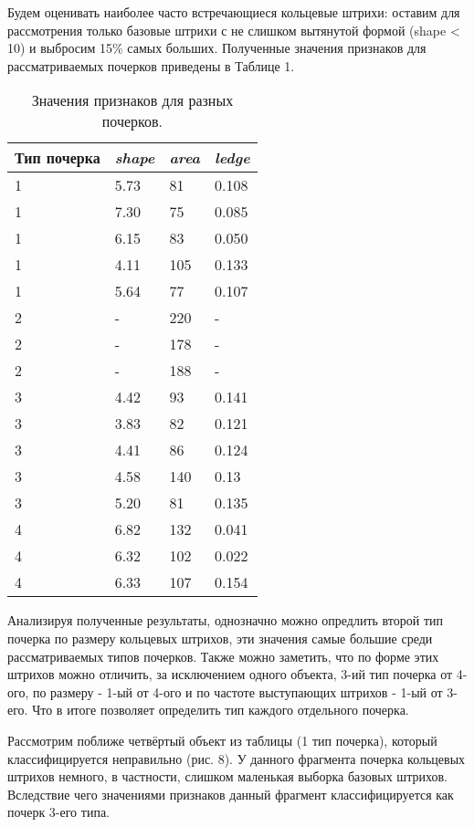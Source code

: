 \documentclass{article}
\begin{document}
Будем оценивать наиболее часто встречающиеся кольцевые штрихи: оставим для рассмотрения только базовые штрихи с не слишком вытянутой формой (shape < 10) и выбросим 15\% самых больших. Полученные значения признаков для рассматриваемых почерков приведены в Таблице 1.

\begin{table}[!h]
    \centering
    \begin{tabular}{|p{4cm}||p{3cm}|p{3cm}|p{3cm}|}
        \hline
        Тип почерка & \emph{shape} & \emph{area} & \emph{ledge}\\ 
        \hline\hline
        1 & 5.73 & 81 & 0.108 \\
        1 & 7.30 & 75 & 0.085 \\
        1 & 6.15 & 83 & 0.050 \\
        1 & 4.11 & 105 & 0.133 \\
        1 & 5.64 & 77 & 0.107 \\
        \hline
        2 & - & 220 & - \\
        2 & - & 178 & - \\
        2 & - & 188 & - \\
        \hline
        3 & 4.42 & 93 & 0.141 \\
        3 & 3.83 & 82 & 0.121 \\
        3 & 4.41 & 86 & 0.124 \\
        3 & 4.58 & 140 & 0.13 \\
        3 & 5.20 & 81 & 0.135 \\
        \hline
        4 & 6.82 & 132 & 0.041 \\
        4 & 6.32 & 102 & 0.022 \\
        4 & 6.33 & 107 & 0.154 \\
        \hline
    \end{tabular}
    \caption{Значения признаков для разных почерков.}
\end{table}

Анализируя полученные результаты, однозначно можно опредлить второй тип почерка по размеру кольцевых штрихов, эти значения самые большие среди рассматриваемых типов почерков. Также можно заметить, что по форме этих штрихов можно отличить, за исключением одного объекта, 3-ий тип почерка от 4-ого, по размеру - 1-ый от 4-ого и по частоте выступающих штрихов - 1-ый от 3-его. Что в итоге позволяет определить тип каждого отдельного почерка. 

Рассмотрим поближе четвёртый объект из таблицы (1 тип почерка), который классифицируется неправильно (рис. 8). У данного фрагмента почерка кольцевых штрихов немного, в частности, слишком маленькая выборка базовых штрихов. Вследствие чего значениями признаков данный фрагмент классифицируется как почерк 3-его типа.
\end{document}

